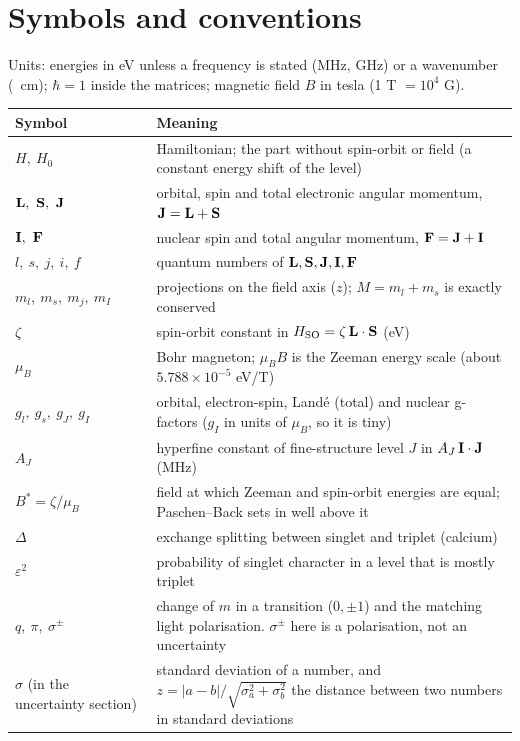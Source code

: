 \section*{Symbols and conventions}
Units: energies in eV unless a frequency is stated (MHz, GHz) or a wavenumber (\si{\per\centi\metre}); $\hbar=1$ inside the matrices; magnetic field $B$ in tesla (1 T $=10^4$ G).
\begin{center}
\small
\begin{tabular}{p{2.6cm}p{11cm}}
\toprule
Symbol & Meaning\\
\midrule
$H,\ H_0$ & Hamiltonian; the part without spin-orbit or field (a constant energy shift of the level)\\
$\vb L,\ \vb S,\ \vb J$ & orbital, spin and total electronic angular momentum, $\vb J=\vb L+\vb S$\\
$\vb I,\ \vb F$ & nuclear spin and total angular momentum, $\vb F=\vb J+\vb I$\\
$l,\ s,\ j,\ i,\ f$ & quantum numbers of $\vb L,\vb S,\vb J,\vb I,\vb F$\\
$m_l,\ m_s,\ m_j,\ m_I$ & projections on the field axis ($z$); $M=m_l+m_s$ is exactly conserved\\
$\zeta$ & spin-orbit constant in $H_\text{SO}=\zeta\,\vb L\cdot\vb S$ (eV)\\
$\mu_B$ & Bohr magneton; $\mu_B B$ is the Zeeman energy scale (about $5.788\times10^{-5}$ eV/T)\\
$g_l,\ g_s,\ g_J,\ g_I$ & orbital, electron-spin, Land\'e (total) and nuclear g-factors ($g_I$ in units of $\mu_B$, so it is tiny)\\
$A_J$ & hyperfine constant of fine-structure level $J$ in $A_J\,\vb I\cdot\vb J$ (MHz)\\
$B^*=\zeta/\mu_B$ & field at which Zeeman and spin-orbit energies are equal; Paschen--Back sets in well above it\\
$\Delta$ & exchange splitting between singlet and triplet (calcium)\\
$\varepsilon^2$ & probability of singlet character in a level that is mostly triplet\\
$q,\ \pi,\ \sigma^\pm$ & change of $m$ in a transition ($0,\pm1$) and the matching light polarisation. $\sigma^\pm$ here is a polarisation, not an uncertainty\\
$\sigma$ (in the uncertainty section) & standard deviation of a number, and $z=|a-b|/\sqrt{\sigma_a^2+\sigma_b^2}$ the distance between two numbers in standard deviations\\

\end{tabular}
\end{center}
